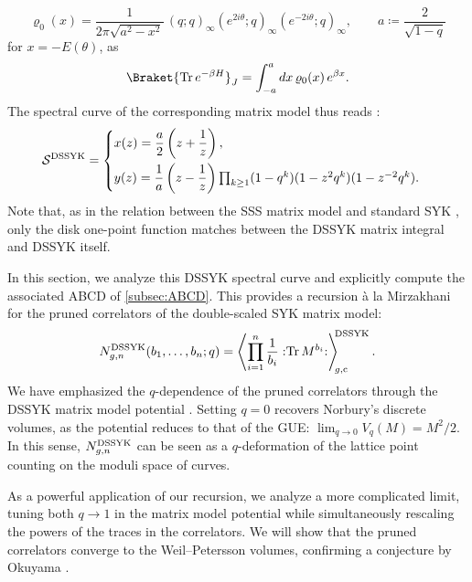 \documentclass[a4paper,11pt,english]{article}
\theoremstyle{plain}
\theoremstyle{definition}
\theoremstyle{plain}
\newcommand{\cc}{\mathrm{c}}
\DeclareMathOperator{\Tr}{Tr}
\newcommand{\normord}[1]{:\mathrel{#1}:}
\newcommand{\NTr}[1]{\normord{\Tr{#1}}}
\newcommand{\mc}[1]{\mathcal{#1}}
\begin{document}
\begin{equation}
    \varrho_0(x)
    =
    \frac{1}{2\pi \sqrt{a^2 - x^2}} \,
    (q;q)_\infty
    (e^{2i\theta};q)_\infty
    (e^{-2i\theta};q)_\infty ,
    \qquad
    a \coloneqq \frac{2}{\sqrt{1-q}}
\end{equation}
for $x = -E(\theta)$, as
\begin{equation}
    \Braket{ \Tr{e^{-\beta H}} }_J
    =
    \int_{-a}^{a}
    dx\, \varrho_0(x)\, e^{\beta x}.
\end{equation}
The spectral curve of the corresponding matrix model thus reads \cite{Oku23}:
\begin{equation}\label{eq:DSSYK}
    \mc{S}^{\textup{DSSYK}}
    =
	\begin{cases}
		x(z) = \dfrac{a}{2}\left( z + \dfrac{1}{z} \right), \\[2ex]
		y(z) = \dfrac{1}{a} \left( z - \dfrac{1}{z} \right)
		\prod_{k \ge 1} (1-q^k)(1-z^2q^k)(1-z^{-2}q^k).
	\end{cases}
\end{equation}
Note that, as in the relation between the SSS matrix model and standard SYK \cite{SSSJTmatrix}, only the disk one-point function matches between the DSSYK matrix integral and DSSYK itself.

In this section, we analyze this DSSYK spectral curve and explicitly compute the associated ABCD of \cref{subsec:ABCD}. This provides a recursion à la Mirzakhani for the pruned correlators of the double-scaled SYK matrix model:
\begin{equation}
    N_{g,n}^{\textup{DSSYK}}(b_1,\ldots,b_n;q)
    =
    \left\langle \prod_{i=1}^n \frac{1}{b_i} \NTr{M^{b_i}} \right\rangle_{\!\!g,\cc}^{\!\!\textup{DSSYK}}.
\end{equation}
We have emphasized the $q$-dependence of the pruned correlators through the DSSYK matrix model potential . Setting $q=0$ recovers Norbury's discrete volumes, as the potential reduces to that of the GUE: $\lim_{q \to 0} V_{q}(M) = M^2/2$. In this sense, $N_{g,n}^{\textup{DSSYK}}$ can be seen as a $q$-deformation of the lattice point counting on the moduli space of curves.

As a powerful application of our recursion, we analyze a more complicated limit, tuning both $q \to 1$ in the matrix model potential while simultaneously rescaling the powers of the traces in the correlators. We will show that the pruned correlators converge to the Weil--Petersson volumes, confirming a conjecture by Okuyama \cite[equation~(6.5)]{Oku23}.
\end{document}
